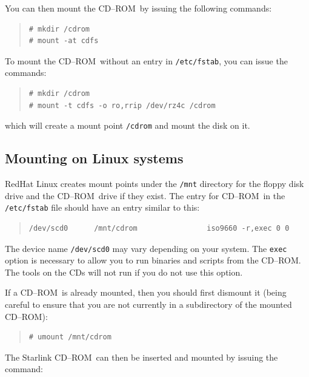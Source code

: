 \documentclass[twoside,11pt]{article}
\newcommand{\xlabel}[1]{}
\renewcommand{\_}{\texttt{\symbol{95}}}
\newcommand{\cdrom}{CD--ROM}
\newcommand{\cdrom}{CD-ROM}
\begin{document}
You can then mount the \cdrom\ by issuing the following commands:

\begin{quote}
\begin{verbatim}
# mkdir /cdrom
# mount -at cdfs
\end{verbatim}
\end{quote}

To mount the \cdrom\ without an entry in \texttt{/etc/fstab}, you can issue
the commands:

\begin{quote}
\begin{verbatim}
# mkdir /cdrom
# mount -t cdfs -o ro,rrip /dev/rz4c /cdrom
\end{verbatim}
\end{quote}

which will create a mount point \texttt{/cdrom} and mount the disk on it.

\subsection{\xlabel{mounting_on_linux}Mounting on Linux systems}
\label{mounting_on_linux}

RedHat Linux creates mount points under the \texttt{/mnt} directory for
the floppy disk drive and the \cdrom\ drive if they exist.  The entry for
\cdrom\ in the \texttt{/etc/fstab} file should have an entry
similar to this:

\begin{quote}
\begin{verbatim}
/dev/scd0      /mnt/cdrom                iso9660 -r,exec 0 0
\end{verbatim}
\end{quote}

The device name \texttt{/dev/scd0} may vary depending on your system.  The
\texttt{exec} option is necessary to allow you to run binaries and
scripts from the \cdrom.   The tools on the CDs will not run if you do not 
use this option.

If a \cdrom\ is already mounted, then you should first dismount it
(being careful to ensure that you are not currently in a subdirectory
of the mounted \cdrom):

\begin{quote}
\begin{verbatim}
# umount /mnt/cdrom
\end{verbatim}
\end{quote}

The Starlink \cdrom\ can then be inserted and mounted by issuing the command:
\end{document}
